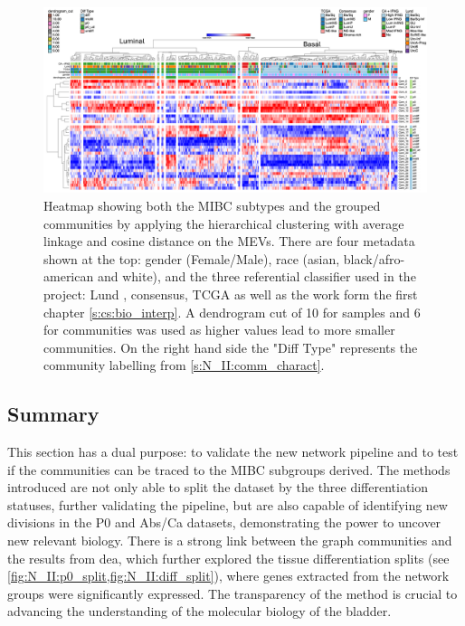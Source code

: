 \begin{figure}
    \includegraphics[width=1.0\textwidth,keepaspectratio]{Sections/Network_II/resources/non_tum/iMev_3_3_cs_13_horiz.png}
    
    \caption{Heatmap showing both the MIBC subtypes and the grouped communities by applying the hierarchical clustering with average linkage and cosine distance on the MEVs. There are four metadata shown at the top: gender (Female/Male), race (asian, black/afro-american and white), and the three referential classifier used in the project: Lund \citet{Marzouka2018-ge}, consensus\citet{Kamoun2020-tj}, TCGA \citet{Robertson2017-mg} as well as the work form the first chapter \cref{s:cs:bio_interp}. A dendrogram cut of 10 for samples and 6 for communities was used as higher values lead to more smaller communities. On the right hand side the "Diff Type" represents the community labelling from \cref{s:N_II:comm_charact}.
    }
    \label{fig:N_II:tum_morph}
\end{figure}


\subsection{Summary}


This section has a dual purpose: to validate the new network pipeline and to test if the communities can be traced to the MIBC subgroups derived. The methods introduced are not only able to split the dataset by the three differentiation statuses, further validating the pipeline, but are also capable of identifying new divisions in the P0 and Abs/Ca datasets, demonstrating the power to uncover new relevant biology. There is a strong link between the graph communities and the results from \acrlong{dea}, which further explored the tissue differentiation splits (see \cref{fig:N_II:p0_split,fig:N_II:diff_split}), where genes extracted from the network groups were significantly expressed. The transparency of the method is crucial to advancing the understanding of the molecular biology of the bladder.


